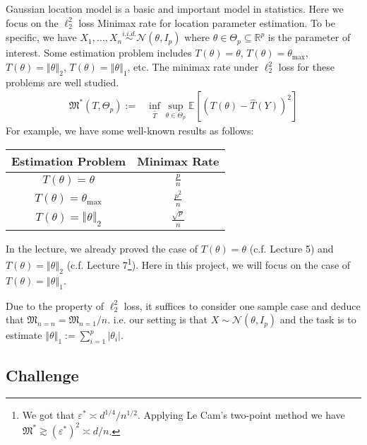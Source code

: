 \documentclass[11pt,a4paper]{article}
\numberwithin{equation}{section}%
\begin{document}
Gaussian location model is a basic and important model in statistics. Here we focus on the $ \ell_2^2 $ loss Minimax rate for location parameter estimation. To be specific, we have $ X_1,\ldots, X_n\mathop{ \sim  }\limits^{i.i.d.}   \mathcal{N}(\theta , I_p )$ where $ \theta \in \Theta _p\subseteq \mathbb{R}^p $ is the parameter of interest. Some estimation problem includes $ T(\theta )=\theta  $, $ T(\theta )=\theta _{\max} $, $ T(\theta )= \left\Vert \theta  \right\Vert _2 $, $ T(\theta )=\left\Vert \theta  \right\Vert  _1 $, etc. The minimax rate under $ \ell_2^2 $ loss for these problems are well studied.
\begin{align*}
    \mathfrak{M}^*(T,\Theta _p):=&\mathop{ \inf }\limits_{\hat{T}} \mathop{ \sup }\limits_{\theta \in \Theta _p} \mathbb{E}_{  }\left[ (T(\theta) -\hat{T}(Y))^2 \right] 
\end{align*}
For example, we have some well-known results as follows:
\begin{table}[H]
    \centering
    \renewcommand\arraystretch{1.15}
    \begin{tabular}{|c|c|}
        \hline
        Estimation Problem & Minimax Rate \\
        \hline
        $ T(\theta )=\theta  $ & $ \frac{p}{n} $ \\
        \hline
        $ T(\theta )=\theta _{\max}  $ & $ \frac{p^2}{n} $ \\
        \hline
        $ T(\theta )=\left\Vert \theta  \right\Vert _2 $ & $ \frac{\sqrt{p}}{n} $ \\
        \hline
    \end{tabular}
\end{table}
In the lecture, we already proved the case of $ T(\theta )=\theta  $ (c.f. Lecture 5) and $ T(\theta )=\left\Vert \theta  \right\Vert _2 $ (c.f. Lecture 7\footnote{We got that $ \varepsilon ^* \asymp d^{1/4}/n^{1/2} $. Applying Le Cam's two-point method we have $ \mathfrak{M}^* \gtrsim (\varepsilon ^*)^2 \asymp d/n $.}). Here in this project, we will focus on the case of $ T(\theta )=\left\Vert \theta  \right\Vert  _1 $.

Due to the property of $ \ell_2^2 $ loss, it suffices to consider one sample case and deduce that $ \mathfrak{M}_{n=n}=\mathfrak{M}_{n=1}/n $. i.e. our setting is that $ X\sim \mathcal{N}(\theta ,I_p) $ and the task is to estimate $ \left\Vert \theta  \right\Vert  _1 :=\sum_{i=1}^p \left\vert \theta _i \right\vert  $.


\subsection{Challenge}
\end{document}

